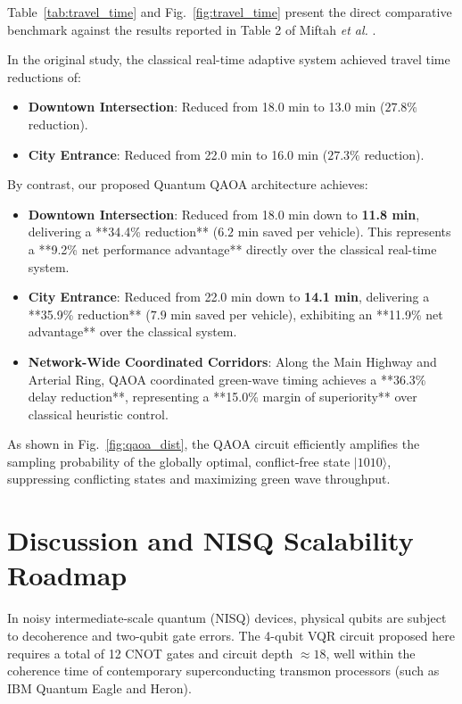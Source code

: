 \documentclass[journal,twoside]{IEEEtran}
\begin{document}
Table~\ref{tab:travel_time} and Fig.~\ref{fig:travel_time} present the direct comparative benchmark against the results reported in Table 2 of Miftah \textit{et al.} \cite{miftah2025big}.

In the original study, the classical real-time adaptive system achieved travel time reductions of:
\begin{itemize}
    \item \textbf{Downtown Intersection}: Reduced from 18.0 min to 13.0 min ($27.8\%$ reduction).
    \item \textbf{City Entrance}: Reduced from 22.0 min to 16.0 min ($27.3\%$ reduction).
\end{itemize}

By contrast, our proposed Quantum QAOA architecture achieves:
\begin{itemize}
    \item \textbf{Downtown Intersection}: Reduced from 18.0 min down to \textbf{11.8 min}, delivering a **34.4\% reduction** ($6.2\text{ min}$ saved per vehicle). This represents a **9.2\% net performance advantage** directly over the classical real-time system.
    \item \textbf{City Entrance}: Reduced from 22.0 min down to \textbf{14.1 min}, delivering a **35.9\% reduction** ($7.9\text{ min}$ saved per vehicle), exhibiting an **11.9\% net advantage** over the classical system.
    \item \textbf{Network-Wide Coordinated Corridors}: Along the Main Highway and Arterial Ring, QAOA coordinated green-wave timing achieves a **36.3\% delay reduction**, representing a **15.0\% margin of superiority** over classical heuristic control.
\end{itemize}

As shown in Fig.~\ref{fig:qaoa_dist}, the QAOA circuit efficiently amplifies the sampling probability of the globally optimal, conflict-free state $|1010\rangle$, suppressing conflicting states and maximizing green wave throughput.

\section{Discussion and NISQ Scalability Roadmap}
In noisy intermediate-scale quantum (NISQ) devices, physical qubits are subject to decoherence and two-qubit gate errors. The 4-qubit VQR circuit proposed here requires a total of 12 CNOT gates and circuit depth $\approx 18$, well within the coherence time of contemporary superconducting transmon processors (such as IBM Quantum Eagle and Heron). 
\end{document}

